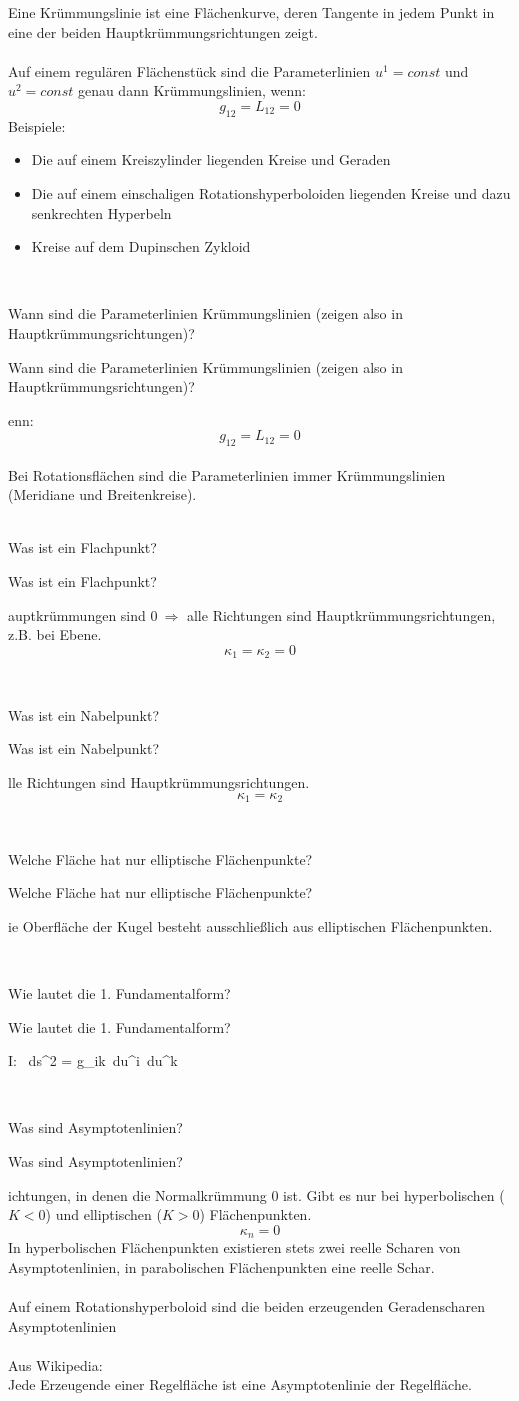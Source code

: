 \documentclass[DIV=1]{scrartcl}
\newcommand{\frage}[3][10]{
    \newpage
    \
    \vspace{#1 em}
    \begin{framed}
        #2
    \end{framed}
    \newpage
    \begin{framed}
        #2
    \end{framed}
    \vspace{2 em}
}
\begin{document}
Eine Krümmungslinie ist eine Flächenkurve, deren Tangente in jedem Punkt in eine der beiden Hauptkrümmungsrichtungen zeigt.\\
\\
Auf einem regulären Flächenstück sind die Parameterlinien $u^1 = const$ und $u^2 = const$ genau dann Krümmungslinien, wenn:
\[
    g_{12} = L_{12} = 0
\]
Beispiele:\\
\begin{itemize}
    \item Die auf einem Kreiszylinder liegenden Kreise und Geraden
    \item Die auf einem einschaligen Rotationshyperboloiden liegenden Kreise und dazu senkrechten Hyperbeln
    \item Kreise auf dem Dupinschen Zykloid
\end{itemize}



\frage{Wann sind die Parameterlinien Krümmungslinien (zeigen also in Hauptkrümmungsrichtungen)?}

Wenn:
\[
    g_{12} = L_{12} = 0
\]
\\
Bei Rotationsflächen sind die Parameterlinien immer Krümmungslinien (Meridiane und Breitenkreise).\\



\frage{ Was ist ein Flachpunkt?}

Hauptkrümmungen sind $0\ \Rightarrow$ alle Richtungen sind Haupt\-krüm\-mungs\-rich\-tung\-en, z.B. bei Ebene.
\[
    \kappa_1 = \kappa_2 = 0
\]



\frage{Was ist ein Nabelpunkt?}

Alle Richtungen sind Hauptkrümmungsrichtungen.
\[
    \kappa_1 = \kappa_2
\]



\frage{Welche Fläche hat nur elliptische Flächenpunkte?}

Die Oberfläche der Kugel besteht ausschließlich aus elliptischen Flächen\-punkten.



\frage{Wie lautet die 1. Fundamentalform?}

\[
    I: \ ds^2 = g_{ik}\, du^i\, du^k
\]



\frage{Was sind Asymptotenlinien?}

Richtungen, in denen die Normalkrümmung $0$ ist. Gibt es nur bei hyperbolischen ($K<0$) und elliptischen ($K>0$) Flächenpunkten.
\[
    \kappa_n = 0
\]
In hyperbolischen Flächenpunkten existieren stets zwei reelle Scharen von Asymptotenlinien, in parabolischen Flächenpunkten eine reelle Schar.\\
\\
Auf einem Rotationshyperboloid sind die beiden erzeugenden Geradenscharen Asymptotenlinien\\
\\
Aus Wikipedia:\\
Jede Erzeugende einer Regelfläche ist eine Asymptotenlinie der Regelfläche.
\end{document}
